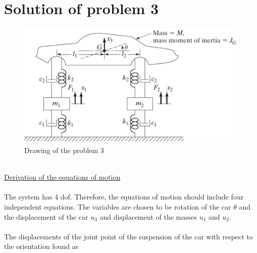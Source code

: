 \documentclass[]{report}
\begin{document}
\section*{Solution of problem 3}
\begin{figure}[th!]
\centering
\includegraphics[width=\linewidth]{./problem3}
\caption[Drawing of the problem 3]{Drawing of the problem 3}
\label{fig:problem3}
\end{figure}
~\\
\underline{Derivation of the equations of motion}\\
\\
The system has 4 dof. Therefore, the equations of motion should include four independent equations. The variables are chosen to be rotation of the car $\theta$ and the displacement of the car $u_3$ and displacement of the masses $u_1$ and $u_2$.\\
\\
The displacements of the joint point of the suspension of the car with respect to the orientation  found as
\end{document}
